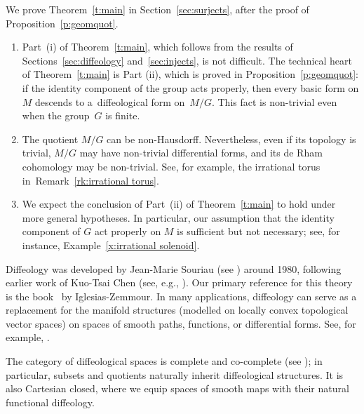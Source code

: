 \documentclass[pdftex]{sigma}
\numberwithin{equation}{section}
\newcommand{\hypref}[2]{{#2~\ref{#1}}}
\begin{document}
We prove Theorem~\ref{t:main} in Section~\ref{sec:surjects},
after the proof of Proposition~\ref{p:geomquot}.

\begin{Remark} \quad
\begin{enumerate}\itemsep=0pt
\item
Part~(i) of Theorem~\ref{t:main}, which follows from
the results of Sections~\ref{sec:diffeology} and~\ref{sec:injects},
is not dif\/f\/icult. The technical heart of Theorem~\ref{t:main} is Part (ii), which is proved in \hypref{p:geomquot}{Proposition}: if the identity component of the group acts properly, then every basic form on $M$ descends to a~dif\/feological form on~$M/G$.
This fact is non-trivial even when the group~$G$ is f\/inite.

\item
The quotient $M/G$ can be non-Hausdorf\/f. Nevertheless, even if its topology
is trivial, $M/G$ may have non-trivial dif\/ferential forms,
and its de Rham cohomology may be non-trivial.
See, for example, the irrational torus in~\hypref{rk:irrational torus}{Remark}.

\item
We expect
the conclusion of Part~(ii) of Theorem~\ref{t:main} to hold
under more general hypotheses.
In particular, our assumption that the identity component of $G$
act properly on $M$ is suf\/f\/icient but not necessary;
see, for instance, \hypref{x:irrational solenoid}{Example}.

\end{enumerate}
\end{Remark}

Dif\/feology was developed by Jean-Marie Souriau (see \cite{souriau})
around 1980, following earlier work of Kuo-Tsai Chen
(see, e.g., \cite{chen1,chen4}).
Our primary reference for this theory is the book~\cite{iglesias}
by Iglesias-Zemmour.
In many applications, dif\/feology can serve as a replacement
for the manifold structures
(modelled on locally convex topological vector spaces)
on spaces of smooth paths, functions, or dif\/ferential forms.
See, for example, \cite{BFW}.

The category of dif\/feological spaces is complete and co-complete
(see \cite{BH}); in particular, subsets and quotients
naturally inherit dif\/feological structures.
It is also Cartesian closed, where we equip spaces of smooth maps
with their natural functional dif\/feology.
\end{document}
